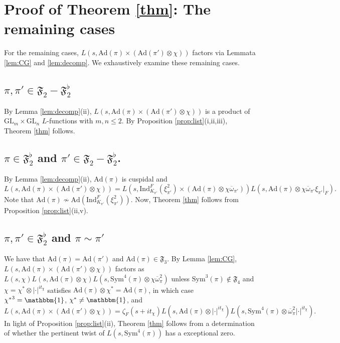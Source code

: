 \documentclass[11pt]{amsart}
\theoremstyle{remark}
\numberwithin{equation}{section}
\begin{document}
\section{Proof of Theorem \ref{thm}: The remaining cases}
\label{sec:thm_part2}

For the remaining cases, $L(s,\mathrm{Ad}(\pi)\times(\mathrm{Ad}(\pi')\otimes\chi))$ factors via Lemmata \ref{lem:CG} and \ref{lem:decomp}.  We exhaustively examine these remaining cases.

\subsection{$\pi,\pi'\in\mathfrak{F}_{2}-\mathfrak{F}_{2}^{\flat}$}
By Lemma \ref{lem:decomp}(ii), $L(s,\mathrm{Ad}(\pi)\times(\mathrm{Ad}(\pi')\otimes\chi))$ is a product of $\mathrm{GL}_m\times\mathrm{GL}_n$ $L$-functions with $m,n \leq 2$. By Proposition \ref{prop:list}(i,ii,iii), Theorem \ref{thm} follows.

\subsection{$\pi\in\mathfrak{F}_{2}^{\flat}$ and $\pi'\in \mathfrak{F}_{2}-\mathfrak{F}_{2}^{\flat}$.}

By Lemma \ref{lem:decomp}(ii), $\mathrm{Ad}(\pi)$ is cuspidal and
\[
L(s,\mathrm{Ad}(\pi)\times(\mathrm{Ad}(\pi')\otimes\chi))=L(s,\mathrm{Ind}_{K_{\pi'}}^F(\xi_{\pi'}^2)\times(\mathrm{Ad}(\pi)\otimes\chi\overline{\omega}_{\pi'})) L(s,\mathrm{Ad}(\pi)\otimes\chi\overline{\omega}_{\pi'}\xi_{\pi'}|_F).
\]
Note that $\mathrm{Ad}(\pi)\not\sim\mathrm{Ad}(\mathrm{Ind}_{K_{\pi'}}^{F}(\xi_{\pi'}^2))$.  Now, Theorem \ref{thm} follows from Proposition \ref{prop:list}(ii,v).


\subsection{$\pi,\pi'\in\mathfrak{F}_{2}^{\flat}$ and $\pi\sim\pi'$}

We have that $\mathrm{Ad}(\pi)=\mathrm{Ad}(\pi')$ and $\mathrm{Ad}(\pi)\in\mathfrak{F}_{3}$.  By Lemma \ref{lem:CG}, $L(s,\mathrm{Ad}(\pi)\times(\mathrm{Ad}(\pi')\otimes\chi))$ factors as $L(s,\chi) L(s,\mathrm{Ad}(\pi)\otimes\chi)L(s,\mathrm{Sym}^4(\pi)\otimes\chi\overline{\omega}_{\pi}^{2})$ unless $\mathrm{Sym}^3(\pi)\notin\mathfrak{F}_{4}$ and $\chi=\chi^*\otimes|\cdot|^{it_{\chi}}$ satisfies $\mathrm{Ad}(\pi)\otimes\chi^*=\mathrm{Ad}(\pi)$, in which case ${\chi^*}^3=\mathbbm{1}$, $\chi^*\neq\mathbbm{1}$, and
\[
L(s,\mathrm{Ad}(\pi)\times(\mathrm{Ad}(\pi')\otimes\chi)) = \zeta_F(s+it_{\chi})L(s,\mathrm{Ad}(\pi)\otimes|\cdot|^{it_{\chi}})L(s,\mathrm{Sym}^4(\pi)\otimes\overline{\omega}_{\pi}^{2}|\cdot|^{it_{\chi}}).
\]
In light of Proposition \ref{prop:list}(ii), Theorem \ref{thm} follows from a determination of whether the pertinent twist of $L(s,\mathrm{Sym}^4(\pi))$ has a exceptional zero.
\end{document}
